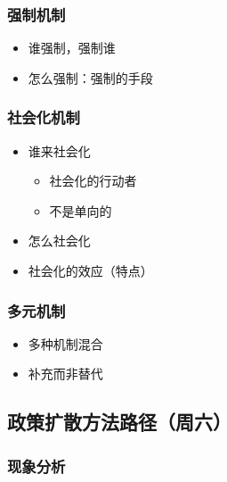 \documentclass[
  12pt,
]{ctexart}
\begin{document}
\hypertarget{ux5f3aux5236ux673aux5236}{%
\subsubsection{强制机制}\label{ux5f3aux5236ux673aux5236}}

\begin{itemize}
\item
  谁强制，强制谁
\item
  怎么强制：强制的手段
\end{itemize}

\hypertarget{ux793eux4f1aux5316ux673aux5236}{%
\subsubsection{社会化机制}\label{ux793eux4f1aux5316ux673aux5236}}

\begin{itemize}
\item
  谁来社会化

  \begin{itemize}
  \item
    社会化的行动者
  \item
    不是单向的
  \end{itemize}
\item
  怎么社会化
\item
  社会化的效应（特点）
\end{itemize}

\hypertarget{ux591aux5143ux673aux5236}{%
\subsubsection{多元机制}\label{ux591aux5143ux673aux5236}}

\begin{itemize}
\item
  多种机制混合
\item
  补充而非替代
\end{itemize}

\hypertarget{ux653fux7b56ux6269ux6563ux65b9ux6cd5ux8defux5f84ux5468ux516d}{%
\subsection{政策扩散方法路径（周六）}\label{ux653fux7b56ux6269ux6563ux65b9ux6cd5ux8defux5f84ux5468ux516d}}

\hypertarget{ux73b0ux8c61ux5206ux6790}{%
\subsubsection{现象分析}\label{ux73b0ux8c61ux5206ux6790}}
\end{document}
